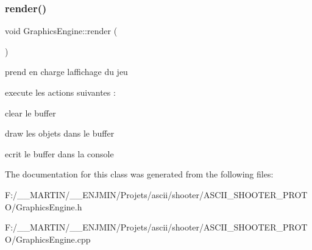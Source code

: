 \subsubsection{\texorpdfstring{render()}{render()}}
{\footnotesize\ttfamily void Graphics\+Engine\+::render (\begin{DoxyParamCaption}{ }\end{DoxyParamCaption})}



prend en charge l\textquotesingle{}affichage du jeu 

execute les actions suivantes \+:
\begin{DoxyItemize}
\item clear le buffer
\item draw les objets dans le buffer
\item ecrit le buffer dans la console 
\end{DoxyItemize}

The documentation for this class was generated from the following files\+:\begin{DoxyCompactItemize}
\item 
F\+:/\+\_\+\+\_\+\+M\+A\+R\+T\+I\+N/\+\_\+\+\_\+\+E\+N\+J\+M\+I\+N/\+Projets/ascii/shooter/\+A\+S\+C\+I\+I\+\_\+\+S\+H\+O\+O\+T\+E\+R\+\_\+\+P\+R\+O\+T\+O/Graphics\+Engine.\+h\item 
F\+:/\+\_\+\+\_\+\+M\+A\+R\+T\+I\+N/\+\_\+\+\_\+\+E\+N\+J\+M\+I\+N/\+Projets/ascii/shooter/\+A\+S\+C\+I\+I\+\_\+\+S\+H\+O\+O\+T\+E\+R\+\_\+\+P\+R\+O\+T\+O/Graphics\+Engine.\+cpp\end{DoxyCompactItemize}

